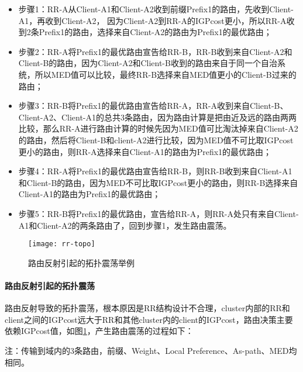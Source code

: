 \begin{itemize}
\item 步骤1：RR-A从Client-A1和Client-A2收到前缀Prefix1的路由，先收到Client-A1，再收到Client-A2， 因为Client-A2到RR-A的IGPcost更小，所以RR-A收到2条Prefix1的路由，选择来自Client-A2的路由为Prefix1的最优路由；
\item 步骤2：RR-A将Prefix1的最优路由宣告给RR-B，RR-B收到来自Client-A2和Client-B的路由，因为Client-A2和Client-B收到的路由来自于同一个自治系统，所以MED值可以比较，最终RR-B选择来自MED值更小的Client-B过来的路由；
\item 步骤3：RR-B将Prefix1的最优路由宣告给RR-A，RR-A收到来自Client-B、Client-A2、Client-A1的总共3条路由，因为路由计算是把由近及远的路由两两比较，那么RR-A进行路由计算的时候先因为MED值可比淘汰掉来自Client-A2的路由，然后将Client-B和client-A2进行比较，因为MED值不可比取IGPcost更小的路由，则RR-A选择来自Client-A1的路由为Prefix1的最优路由；
\item 步骤4：RR-A将Prefix1的最优路由宣告给RR-B，则RR-B收到来自Client-A1和Client-B的路由，因为MED不可比取IGPcost更小的路由，则RR-B选择来自Client-A1的路由为Prefix1的最优路由；
\item 步骤5：RR-B将Prefix1的最优路由，宣告给RR-A，则RR-A处只有来自Client-A1和Client-A2的两条路由了，回到步骤1，发生路由震荡。
\end{itemize}


\begin{figure}
  \centering
  \texttt{[image: rr-topo]}
  \caption{路由反射引起的拓扑震荡举例\cite{ibgp2016infocom}}
  \label{fig:rr-topo}
\end{figure}

\paragraph{路由反射引起的拓扑震荡}

路由反射导致的拓扑震荡，根本原因是RR结构设计不合理，cluster内部的RR和client之间的IGPcost远大于RR和其他cluster内的client的IGPcost，路由决策主要依赖IGPcost值，如图\ref{fig:rr-topo}，产生路由震荡的过程如下：

注：传输到域内的3条路由，前缀、Weight、Local Preference、As-path、MED均相同。

